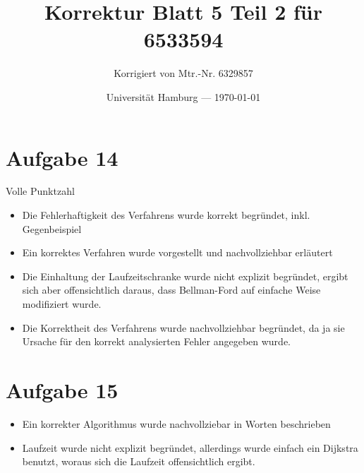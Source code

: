 \documentclass[parskip=half,a4paper]{scrartcl}
\title{Korrektur Blatt 5 Teil 2 für 6533594}
\author{Korrigiert von Mtr.-Nr. 6329857}
\date{Universität Hamburg --- \today}
\begin{document}
\maketitle %

\section{Aufgabe 14}

Volle Punktzahl

\begin{itemize}
    \item Die Fehlerhaftigkeit des Verfahrens wurde korrekt begründet, inkl. Gegenbeispiel
    \item Ein korrektes Verfahren wurde vorgestellt und nachvollziehbar erläutert
    \item Die Einhaltung der Laufzeitschranke wurde nicht explizit begründet, ergibt sich aber offensichtlich daraus, dass Bellman-Ford auf einfache Weise modifiziert wurde.
    \item Die Korrektheit des Verfahrens wurde nachvollziehbar begründet, da ja sie Ursache für den korrekt analysierten Fehler angegeben wurde.
\end{itemize}

\section{Aufgabe 15}


\begin{itemize}
    \item Ein korrekter Algorithmus wurde nachvollziebar in Worten beschrieben
    \item Laufzeit wurde nicht explizit begründet, allerdings wurde einfach ein Dijkstra benutzt, woraus sich die Laufzeit offensichtlich ergibt.
\end{itemize}
\end{document}
